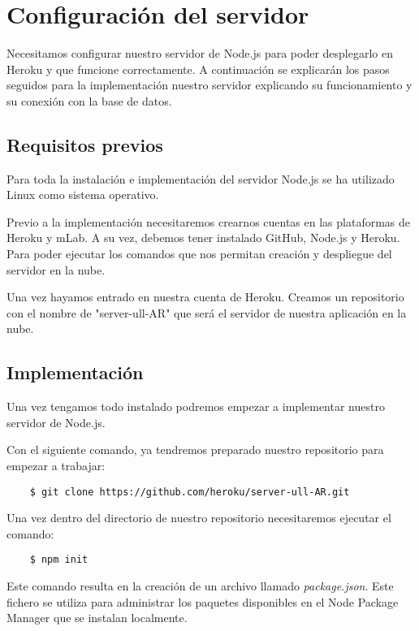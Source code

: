 \section{Configuración del servidor}

Necesitamos configurar nuestro servidor de Node.js para poder desplegarlo en Heroku y que funcione correctamente. A continuación se explicarán los pasos seguidos para la implementación nuestro servidor explicando su funcionamiento y su conexión con la base de datos.

\subsection{Requisitos previos}
Para toda la instalación e implementación del servidor Node.js se ha utilizado Linux como sistema operativo.

Previo a la implementación necesitaremos crearnos cuentas en las plataformas de Heroku y mLab. A su vez, debemos tener instalado GitHub, Node.js y Heroku. Para poder ejecutar los comandos que nos permitan creación y despliegue del servidor en la nube.

Una vez hayamos entrado en nuestra cuenta de Heroku. Creamos un repositorio con el nombre de "server-ull-AR" que será el servidor de nuestra aplicación en la nube.

\subsection{Implementación}

Una vez tengamos todo instalado podremos empezar a implementar nuestro servidor de Node.js.

Con el siguiente comando, ya tendremos preparado nuestro repositorio para empezar a trabajar:

\begin{lstlisting}
    $ git clone https://github.com/heroku/server-ull-AR.git
\end{lstlisting}

Una vez dentro del directorio de nuestro repositorio necesitaremos ejecutar el comando:

\begin{lstlisting}
    $ npm init
\end{lstlisting}

Este comando resulta en la creación de un archivo llamado \textit{package.json}. Este fichero se utiliza para administrar los paquetes disponibles en el Node Package Manager que se instalan localmente.

